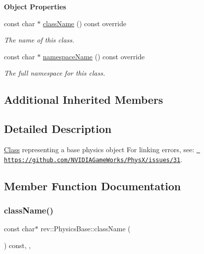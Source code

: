 \begin{Indent}\textbf{ Object Properties}\par
\begin{DoxyCompactItemize}
\item 
const char $\ast$ \mbox{\hyperlink{classrev_1_1_physics_base_ad997bc1504ff6dccccbc3d8d0ea6e6a5}{class\+Name}} () const override
\begin{DoxyCompactList}\small\item\em The name of this class. \end{DoxyCompactList}\item 
const char $\ast$ \mbox{\hyperlink{classrev_1_1_physics_base_acf58cc81cff2ca957dcc68fe9a9a84a1}{namespace\+Name}} () const override
\begin{DoxyCompactList}\small\item\em The full namespace for this class. \end{DoxyCompactList}\end{DoxyCompactItemize}
\end{Indent}
\subsection*{Additional Inherited Members}


\subsection{Detailed Description}
\mbox{\hyperlink{struct_class}{Class}} representing a base physics object For linking errors, see\+: \href{https://github.com/NVIDIAGameWorks/PhysX/issues/31}{\texttt{ https\+://github.\+com/\+N\+V\+I\+D\+I\+A\+Game\+Works/\+Phys\+X/issues/31}}. 

\subsection{Member Function Documentation}
\mbox{\label{classrev_1_1_physics_base_ad997bc1504ff6dccccbc3d8d0ea6e6a5}} 
\subsubsection{\texorpdfstring{className()}{className()}}
{\footnotesize\ttfamily const char$\ast$ rev\+::\+Physics\+Base\+::class\+Name (\begin{DoxyParamCaption}{ }\end{DoxyParamCaption}) const\hspace{0.3cm}{\ttfamily [inline]}, {\ttfamily [override]}, {\ttfamily [virtual]}}



